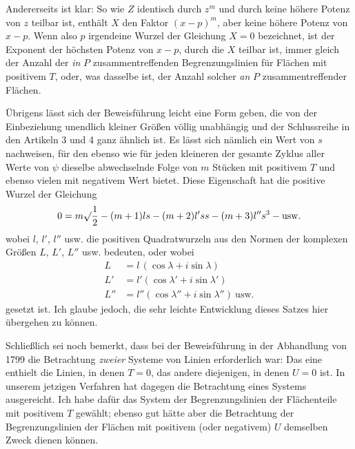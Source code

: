 Andererseits ist klar: So wie $Z$ identisch durch $z^m$ und durch keine höhere Potenz von $z$ teilbar ist, enthält $X$ den Faktor $(x-p)^m$, aber keine höhere Potenz von $x-p$. Wenn also $p$ irgendeine Wurzel der Gleichung $X=0$ bezeichnet, ist der Exponent der höchsten Potenz von $x-p$, durch die $X$ teilbar ist, immer gleich der Anzahl der \emph{in} $P$ zusammentreffenden Begrenzungslinien für Flächen mit positivem $T$, oder, was dasselbe ist, der Anzahl solcher \emph{an} $P$ zusammentreffender Flächen.

Übrigens lässt sich der Beweisführung leicht eine Form geben, die von der Einbeziehung unendlich kleiner Größen völlig unabhängig und der Schlussreihe in den Artikeln 3 und 4 ganz ähnlich ist. Es lässt sich nämlich ein Wert von $s$ nachweisen, für den ebenso wie für jeden kleineren der gesamte Zyklus aller Werte von $\psi$ dieselbe abwechselnde Folge von $m$ Stücken mit positivem $T$ und ebenso vielen mit negativem Wert bietet. Diese Eigenschaft hat die positive Wurzel der Gleichung
\[
0=m\surd\frac{1}{2}-(m+1)ls-(m+2)l'ss-(m+3)l''s^3-\mbox{usw.}
\]
wobei $l$, $l'$, $l''$ usw. die positiven Quadratwurzeln aus den Normen der komplexen Größen $L$, $L'$, $L''$ usw. bedeuten, oder wobei
\[
\begin{array}{rl}
L&=l\,(\cos\lambda+i\sin\lambda)\\
L'&=l'(\cos\lambda'+i\sin\lambda')\\
L''&=l''(\cos\lambda''+i\sin\lambda'')\ \mbox{usw.}
\end{array}
\]
gesetzt ist. Ich glaube jedoch, die sehr leichte Entwicklung dieses Satzes hier übergehen zu können.

Schließlich sei noch bemerkt, dass bei der Beweisführung in der Abhandlung von 1799 die Betrachtung \emph{zweier} Systeme von Linien erforderlich war: Das eine enthielt die Linien, in denen $T=0$, das andere diejenigen, in denen $U=0$ ist. In unserem jetzigen Verfahren hat dagegen die Betrachtung eines Systems ausgereicht. Ich habe dafür das System der Begrenzungslinien der Flächenteile mit positivem $T$ gewählt; ebenso gut hätte aber die Betrachtung der Begrenzungslinien der Flächen mit positivem (oder negativem) $U$ demselben Zweck dienen können.

